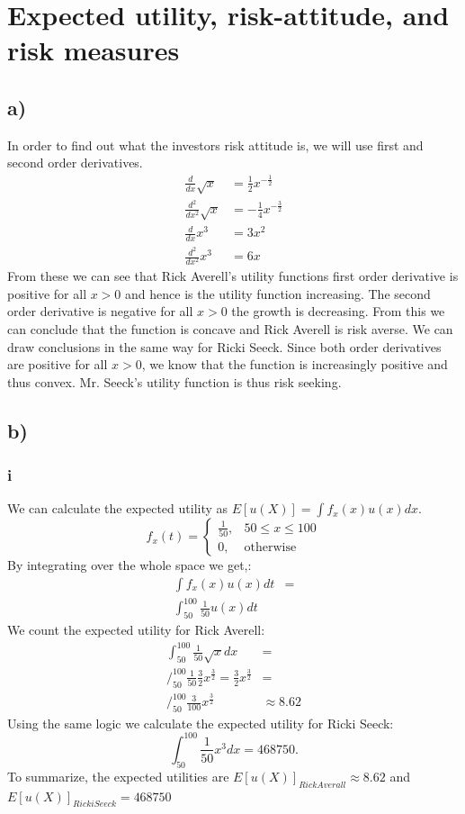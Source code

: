 \documentclass{article}
\begin{document}
\section{Expected utility, risk-attitude, and risk measures}
\subsection{a)}
	In order to find out what the investors risk attitude is, we will use first and second order derivatives. 
	\begin{align}
		\frac{d}{dx}\sqrt{x} &= \frac{1}{2}x^{-\frac{1}{2}} \\
		\frac{d^2}{dx^2}\sqrt{x} &= -\frac{1}{4}x^{-\frac{3}{2}} \\
		\frac{d}{dx}x^3 &=  3x^2\\
		\frac{d^2}{dx^2}x^3 &= 6x
	\end{align}
	From these we can see that Rick Averell's utility functions first order derivative is positive for all $x>0$ and hence is the utility function increasing. The second order derivative is negative for all $x>0$ the growth is decreasing. From this we can conclude that the function is concave and Rick Averell is risk averse.
	We can draw conclusions in the same way for Ricki Seeck. Since both order derivatives are positive for all $x>0$, we know that the function is increasingly positive and thus convex. Mr. Seeck's utility function is thus risk seeking. 
\subsection{b)}
\subsubsection{i}
	We can calculate the expected utility as $E[u(X)] = \int f_x(x) u(x)dx$. 
	\begin{equation}
		f_x(t) = 
		\begin{cases}
			 \frac{1}{50}, &  50 \leq x \leq 100 \\
			 0, & \mbox{otherwise}
		\end{cases}
	\end{equation}
	By integrating over the whole space we get,:
	\begin{align}
		\int f_x(x) u(x)dt &= \\
		\int_{50}^{100} \frac{1}{50} u(x) dt& 
	\end{align}
	We count the expected utility for Rick Averell:
	\begin{align}
		\int_{50}^{100} \frac{1}{50} \sqrt{x} dx &=  \\
		\Bigg/_{50}^{100} \frac{1}{50} \frac{3}{2} x^{\frac{3}{2}} = \frac{3}{2} x^{\frac{3}{2}} &= \\
		\Bigg/_{50}^{100} \frac{3}{100} x^{\frac{3}{2}}	& \approx 8.62		
	\end{align}
	Using the same logic we calculate the expected utility for Ricki Seeck:
	\begin{equation}
		\int_{50}^{100} \frac{1}{50} x^3 dx  = 468750.	
	\end{equation}
	To summarize, the expected utilities are $E[u(X)]_{Rick Averall} \approx 8.62$ and $E[u(X)]_{Ricki Seeck} = 468750$
	
\end{document}
